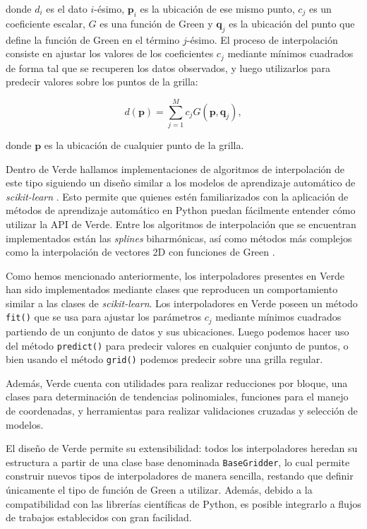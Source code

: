 \noindent donde $d_i$ es el dato $i$-ésimo, $\mathbf{p}_i$ es la ubicación de
ese mismo punto, $c_j$ es un coeficiente escalar, $G$ es una función de Green y
$\mathbf{q}_j$ es la ubicación del punto que define la función de Green en el
término $j$-ésimo.
El proceso de interpolación consiste en ajustar los valores de los
coeficientes $c_j$ mediante mínimos cuadrados de forma tal que se recuperen los
datos observados, y luego utilizarlos para predecir valores sobre los puntos de
la grilla:

\begin{equation}
    d(\mathbf{p}) = \sum_{j=1}^M c_j G(\mathbf{p}, \mathbf{q}_j),
\end{equation}

\noindent donde $\mathbf{p}$ es la ubicación de cualquier punto de la grilla.

Dentro de Verde hallamos implementaciones de algoritmos de interpolación
de este tipo siguiendo un diseño similar
a los modelos de aprendizaje automático de \emph{scikit-learn}
\citep{sklearn2011}. Esto permite que quienes estén familiarizados con la
aplicación de métodos de aprendizaje automático en Python puedan fácilmente
entender cómo utilizar la \ac{API} de Verde.
Entre los algoritmos de interpolación que se encuentran implementados están las
\emph{splines} biharmónicas, así como métodos más complejos como la
interpolación de vectores 2D con funciones de Green \citep{sandwell2016}.

Como hemos mencionado anteriormente, los interpoladores presentes en
Verde han sido implementados mediante clases que reproducen un
comportamiento similar a las clases de \emph{scikit-learn}.
Los interpoladores en Verde poseen un método \texttt{fit()} que se usa para
ajustar los parámetros $c_j$ mediante mínimos cuadrados partiendo de un
conjunto de datos y sus ubicaciones. Luego podemos hacer uso del método
\texttt{predict()} para predecir valores en cualquier conjunto de puntos,
o bien usando el método \texttt{grid()} podemos predecir sobre una grilla
regular.

Además, Verde cuenta con utilidades para realizar reducciones por
bloque, una clases para determinación de tendencias polinomiales, funciones
para el manejo de coordenadas, y herramientas para realizar validaciones
cruzadas y selección de modelos.

El diseño de Verde permite su extensibilidad: todos los interpoladores
heredan su estructura a partir de una clase base denominada
\texttt{BaseGridder}, lo cual permite construir nuevos tipos de
interpoladores de manera sencilla, restando que definir únicamente el tipo de
función de Green a utilizar.
Además, debido a la compatibilidad con las librerías científicas de Python, es
posible integrarlo a flujos de trabajos establecidos con gran facilidad.

